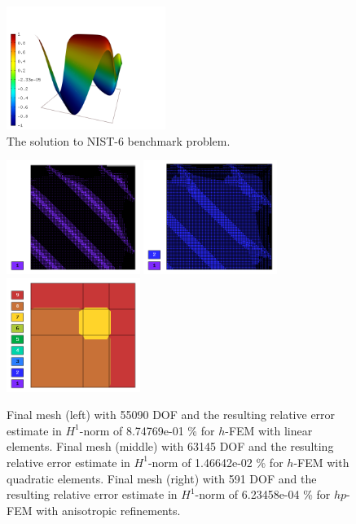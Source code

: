 \documentclass[12pt]{elsarticle}
\begin{document}
\begin{figure}[!ht]
\centering
\includegraphics[height=4cm]{nist/nist-6/solution.png}
\caption{The solution to NIST-6 benchmark problem.}
\label{fig:sln-nist06}
\end{figure}

\begin{figure}[H]
\centering
\includegraphics[height=3.7cm]{nist/nist-6/mesh_h1_aniso.png}
\includegraphics[height=3.7cm]{nist/nist-6/mesh_h2_aniso.png}
\includegraphics[height=3.7cm]{nist/nist-6/mesh_hp_aniso.png}
\caption{
Final mesh (left) with 55090 DOF and the resulting
relative error estimate in $H^1$-norm of 8.74769e-01 \% for $h$-FEM with linear elements.
Final mesh (middle) with 63145 DOF and the resulting
relative error estimate in $H^1$-norm of 1.46642e-02 \% for $h$-FEM with quadratic elements.
Final mesh (right) with 591 DOF and the resulting
relative error estimate in $H^1$-norm of 6.23458e-04 \% for $hp$-FEM with anisotropic refinements.}
\label{fig:nist-6-hp-aniso}
\end{figure}
\end{document}
